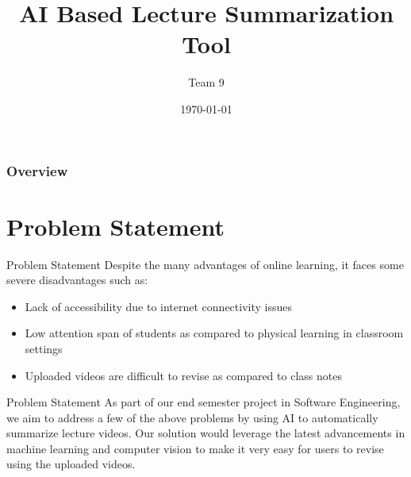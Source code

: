 \documentclass{beamer}
\title[Short title]{AI Based Lecture Summarization Tool} %
\author{
  Team 9\\
} %
\institute[IIIT-H] %
{
IIIT Hyderabad\\ %
\medskip
}
\date{\today} %
\begin{document}
\begin{frame}
\titlepage %
\end{frame}

\begin{frame}
\frametitle{Overview} %
\tableofcontents %
\end{frame}


\section{Problem Statement}
\begin{frame}{Problem Statement}
Despite the many advantages of online learning, it faces some severe disadvantages such as:
    \begin{itemize}
        \item Lack of accessibility due to internet connectivity issues
        \item Low attention span of students as compared to physical learning in classroom settings
        \item Uploaded videos are difficult to revise as compared to class notes
    \end{itemize}
\end{frame}

\begin{frame}{Problem Statement}
As part of our end semester project in Software Engineering, we aim to address a few of
the above problems by using AI to automatically summarize lecture videos. Our solution would
leverage the latest advancements in machine learning and computer vision to make it very easy for users to revise using the uploaded videos. 
\end{frame}
\end{document}
